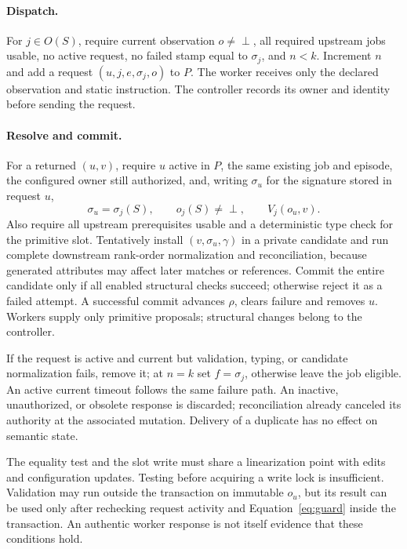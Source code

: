 \documentclass[pdflatex,sn-mathphys-num]{sn-jnl}
\theoremstyle{thmstyleone}
\theoremstyle{thmstylethree}
\theoremstyle{thmstyletwo}
\newcommand{\Sig}{\sigma}
\newcommand{\botv}{\perp}
\begin{document}
\paragraph{Dispatch.} For $j\in O(S)$, require current observation $o\ne\botv$, all required upstream jobs usable, no active request, no failed stamp equal to $\Sig_j$, and $n<k$. Increment $n$ and add a request $(u,j,e,\Sig_j,o)$ to $P$. The worker receives only the declared observation and static instruction. The controller records its owner and identity before sending the request.

\paragraph{Resolve and commit.} For a returned $(u,v)$, require $u$ active in $P$, the same existing job and episode, the configured owner still authorized, and, writing $\Sig_u$ for the signature stored in request $u$,
\begin{equation}\label{eq:guard}
\Sig_u=\Sig_j(S),\qquad o_j(S)\ne\botv,\qquad V_j(o_u,v).
\end{equation}
Also require all upstream prerequisites usable and a deterministic type check for the primitive slot. Tentatively install $(v,\Sig_u,\gamma)$ in a private candidate and run complete downstream rank-order normalization and reconciliation, because generated attributes may affect later matches or references. Commit the entire candidate only if all enabled structural checks succeed; otherwise reject it as a failed attempt. A successful commit advances $\rho$, clears failure and removes $u$. Workers supply only primitive proposals; structural changes belong to the controller. 

If the request is active and current but validation, typing, or candidate normalization fails, remove it; at $n=k$ set $f=\Sig_j$, otherwise leave the job eligible. An active current timeout follows the same failure path. An inactive, unauthorized, or obsolete response is discarded; reconciliation already canceled its authority at the associated mutation. Delivery of a duplicate has no effect on semantic state.

The equality test and the slot write must share a linearization point with edits and configuration updates. Testing before acquiring a write lock is insufficient. Validation may run outside the transaction on immutable $o_u$, but its result can be used only after rechecking request activity and Equation~\eqref{eq:guard} inside the transaction. An authentic worker response is not itself evidence that these conditions hold.
\end{document}
